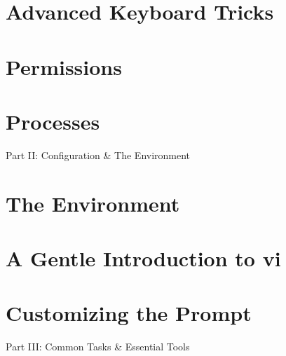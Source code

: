 \documentclass[oneside]{book}
\numberwithin{equation}{section}
\begin{document}

\section{Advanced Keyboard Tricks}


\section{Permissions}


\section{Processes}


\begin{center}
	\huge Part II: Configuration \& The Environment
\end{center}

\section{The Environment}


\section{A Gentle Introduction to vi}


\section{Customizing the Prompt}


\begin{center}
	\huge Part III: Common Tasks \& Essential Tools
\end{center}
\end{document}
